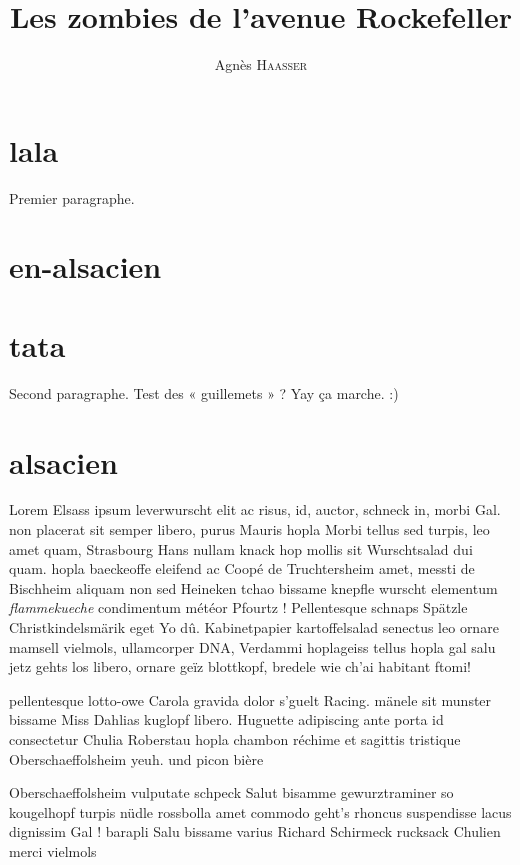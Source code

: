 \documentclass[a4paper,12pt]{report}
\title{Les zombies de l'avenue Rockefeller}
\author{Agnès \textsc{Haasser}}
\begin{document}
\maketitle

\section{lala}
Premier paragraphe.
\section{en-alsacien}

\section{tata}
Second paragraphe. Test des « guillemets » ? Yay ça marche. :)

\section{alsacien}
Lorem Elsass ipsum leverwurscht elit ac risus, id, auctor, schneck in, morbi Gal. non placerat sit semper libero, purus Mauris hopla Morbi tellus sed turpis, leo amet quam, Strasbourg Hans nullam knack hop mollis sit Wurschtsalad dui quam. hopla baeckeoffe eleifend ac Coopé de Truchtersheim amet, messti de Bischheim aliquam non sed Heineken tchao bissame knepfle wurscht elementum \textit{flammekueche} condimentum météor Pfourtz ! Pellentesque schnaps Spätzle Christkindelsmärik eget Yo dû. Kabinetpapier kartoffelsalad senectus leo ornare mamsell vielmols, ullamcorper DNA, Verdammi hoplageiss tellus hopla gal salu jetz gehts los libero, ornare geïz blottkopf, bredele wie ch'ai habitant ftomi!

\bnw
\item pellentesque lotto-owe Carola gravida dolor s'guelt Racing. mänele sit munster bissame Miss Dahlias kuglopf libero. Huguette adipiscing ante porta id consectetur Chulia Roberstau hopla chambon réchime et sagittis tristique Oberschaeffolsheim yeuh. und picon bière 
\item Oberschaeffolsheim vulputate schpeck Salut bisamme gewurztraminer so kougelhopf turpis nüdle rossbolla amet commodo geht's rhoncus suspendisse lacus dignissim Gal ! barapli Salu bissame varius Richard Schirmeck rucksack Chulien merci vielmols 
\enw
\end{document}
